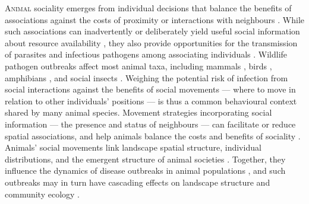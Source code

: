 
\newrefcontext[sorting=ynt]

\lettrine{A}{nimal} sociality emerges from individual decisions that balance the benefits of associations against the costs of proximity or interactions with neighbours \autocite[][]{tanner2012,webber2018,webber2022,gil2018}.
While such associations can inadvertently or deliberately yield useful social information about resource availability \autocite{danchin2004,dall2005,gil2018}, they also provide opportunities for the transmission of parasites and infectious pathogens among associating individuals \autocite[][]{weinstein2018,romano2020,albery2021,cantor2021,romano2021}.
Wildlife pathogen outbreaks affect most animal taxa, including mammals \autocite{blehert2009,fereidouni2019,chandler2021,kuchipudi2022}, birds \autocite{wille2022}, amphibians \autocite{scheele2019}, and social insects \autocite{goulson2015}.
Weighing the potential risk of infection from social interactions against the benefits of social movements --- where to move in relation to other individuals' positions --- is thus a common behavioural context shared by many animal species.
Movement strategies incorporating social information --- the presence and status of neighbours --- can facilitate or reduce spatial associations, and help animals balance the costs and benefits of sociality \autocite{albery2021,gil2018,webber2018,webber2022}.
Animals' social movements link landscape spatial structure, individual distributions, and the emergent structure of animal societies \autocite{gil2018,webber2022,kurvers2014}.
Together, they influence the dynamics of disease outbreaks in animal populations \autocite{white2018a,romano2020,romano2021,keeling2001}, and such outbreaks may in turn have cascading effects on landscape structure and community ecology \autocite{monk2022}.

